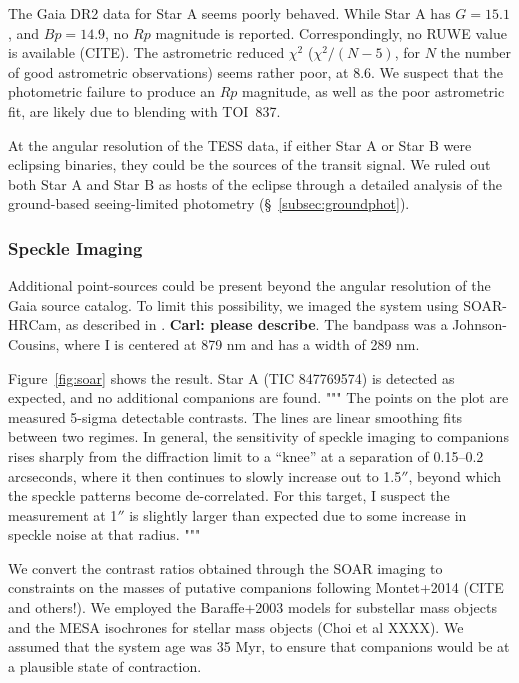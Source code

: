 \documentclass[12pt,twocolumn,tighten]{aastex62}
\newcommand{\tn}{TOI~837} %
\begin{document}
The Gaia DR2 data for Star A seems poorly behaved.  While
Star A has $G=15.1$, and $Bp=14.9$, no $Rp$ magnitude is reported.
Correspondingly, no RUWE value is available (CITE).  The astrometric
reduced $\chi^2$ ($\chi^2 / (N-5)$, for $N$ the number of good
astrometric observations) seems rather poor, at $8.6$.  We suspect
that the photometric failure to produce an $Rp$ magnitude, as well as
the poor astrometric fit, are likely due to blending with \tn.

At the angular resolution of the TESS data, if either Star A or Star B
were eclipsing binaries, they could be the sources of the transit
signal.  We ruled out both Star A and Star B as hosts of the eclipse
through a detailed analysis of the ground-based seeing-limited
photometry (\S~\ref{subsec:groundphot}).

\subsubsection{Speckle Imaging}

Additional point-sources could be present beyond the angular
resolution of the Gaia source catalog.
To limit this possibility,
we imaged the system using SOAR-HRCam, as described in
\citet{ziegler_soar_2020}.
{\bf Carl: please describe}.
The bandpass was a Johnson-Cousins,
where I is centered at 879 nm and has a width of 289 nm.

Figure~\ref{fig:soar} shows the result.
Star A (TIC 847769574) is detected as expected, and no additional
companions are found.
"""
The points on the plot are measured 5-sigma detectable contrasts. The
lines are linear smoothing fits between two regimes. In general, the
sensitivity of speckle imaging to companions rises sharply from the
diffraction limit to a ``knee'' at a separation of 0.15--0.2
arcseconds, where it then continues to slowly increase out to 1.5$''$,
beyond which the speckle patterns become de-correlated. For this
target, I suspect the measurement at 1$''$ is slightly larger than
expected due to some increase in speckle noise at that radius.
"""

We convert the contrast ratios obtained through the SOAR imaging to
constraints on the masses of putative companions following Montet+2014
(CITE and others!).  We employed the Baraffe+2003 models for
substellar mass objects and the MESA isochrones for stellar mass
objects (Choi et al XXXX).  We assumed that the system age was 35 Myr,
to ensure that companions would be at a plausible state of
contraction.
\end{document}
